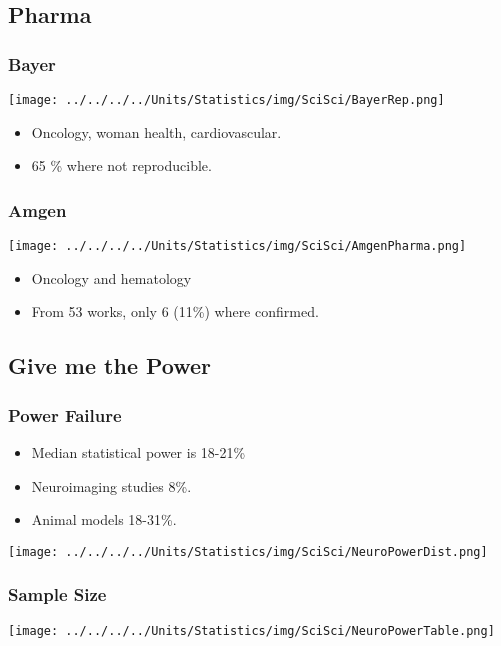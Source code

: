 \documentclass[10pt,article]{article}
\begin{document}
\subsection{Pharma}
\label{sec:org7a0d3f3}
\subsubsection{Bayer}
\label{sec:org1969961}
\begin{center}
\texttt{[image: ../../../../Units/Statistics/img/SciSci/BayerRep.png]}
\end{center}
\begin{itemize}
\item Oncology, woman health, cardiovascular.
\item 65 \% where not reproducible.
\end{itemize}
\subsubsection{Amgen}
\label{sec:org666f12e}
\begin{center}
\texttt{[image: ../../../../Units/Statistics/img/SciSci/AmgenPharma.png]}
\end{center}
\begin{itemize}
\item Oncology and hematology
\item From 53 works, only 6 (11\%) where confirmed.
\end{itemize}
\subsection{Give me the Power}
\label{sec:org1737cd7}
\subsubsection{Power Failure}
\label{sec:org257bdef}
\begin{itemize}
\item Median statistical power is 18-21\%
\item Neuroimaging studies 8\%.
\item Animal models 18-31\%.
\end{itemize}
\begin{center}
\texttt{[image: ../../../../Units/Statistics/img/SciSci/NeuroPowerDist.png]}
\end{center}
\subsubsection{Sample Size}
\label{sec:orgade3876}
\begin{center}
\texttt{[image: ../../../../Units/Statistics/img/SciSci/NeuroPowerTable.png]}
\end{center}
\end{document}
